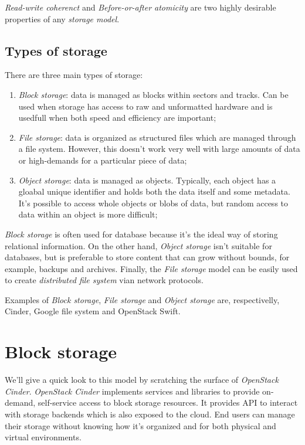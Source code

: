 \noindent
\emph{Read-write coherenct} and \emph{Before-or-after atomicity} are two highly
desirable properties of any \emph{storage model}.

\subsection{Types of storage}
There are three main types of storage:
\begin{enumerate}
    \item \emph{Block storage}: data is managed as blocks within sectors and
    tracks. Can be used when storage has access to raw and unformatted hardware
    and is usedfull when both speed and efficiency are important;
    \item \emph{File storage}: data is organized as structured files which are
    managed through a file system. However, this doesn't work very well with
    large amounts of data or high-demands for a particular piece of data;
    \item \emph{Object storage}: data is managed as objects. Typically, each
    object has a gloabal unique identifier and holds both the data itself and
    some metadata. It's possible to access whole objects or blobs of data, but
    random access to data within an object is more difficult;
\end{enumerate}

\noindent
\emph{Block storage} is often used for database because it's the ideal way of
storing relational information. On the other hand, \emph{Object storage} isn't
suitable for databases, but is preferable to store content that can grow without
bounds, for example, backups and archives. Finally, the \emph{File storage} model
can be easily used to create \emph{distributed file system} vian network protocols.

Examples of \emph{Block storage}, \emph{File storage} and \emph{Object storage}
are, respectivelly, Cinder, Google file system and OpenStack Swift.

\section{Block storage}
We'll give a quick look to this model by scratching the surface of \emph{OpenStack
Cinder}. \emph{OpenStack Cinder} implements services and libraries to provide
on-demand, self-service access to block storage resources. It provides API to
interact with storage backends which is also exposed to the cloud. End users can
manage their storage without knowing how it's organized and for both physical and
virtual environments.


